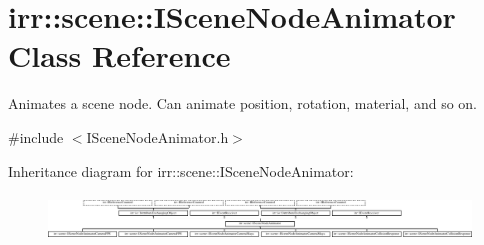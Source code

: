 \hypertarget{classirr_1_1scene_1_1ISceneNodeAnimator}{}\section{irr\+:\+:scene\+:\+:I\+Scene\+Node\+Animator Class Reference}
\label{classirr_1_1scene_1_1ISceneNodeAnimator}


Animates a scene node. Can animate position, rotation, material, and so on.  




{\ttfamily \#include $<$I\+Scene\+Node\+Animator.\+h$>$}

Inheritance diagram for irr\+:\+:scene\+:\+:I\+Scene\+Node\+Animator\+:\begin{figure}[H]
\begin{center}
\leavevmode
\includegraphics[height=1.240310cm]{classirr_1_1scene_1_1ISceneNodeAnimator}
\end{center}
\end{figure}
